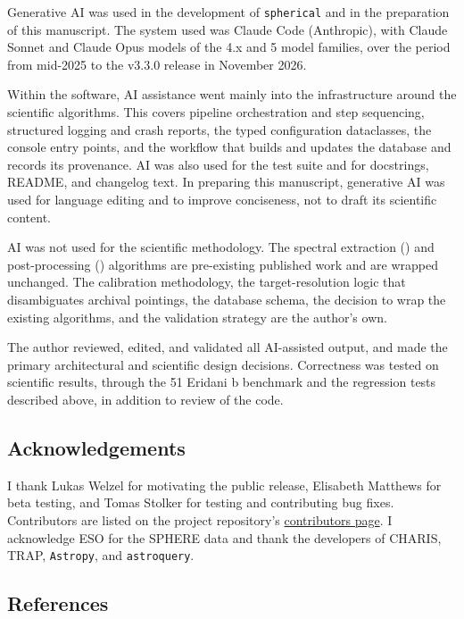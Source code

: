 \documentclass[
]{article}
\begin{document}
Generative AI was used in the development of \texttt{spherical} and in
the preparation of this manuscript. The system used was Claude Code
(Anthropic), with Claude Sonnet and Claude Opus models of the 4.x and 5
model families, over the period from mid-2025 to the v3.3.0 release in
November 2026.

Within the software, AI assistance went mainly into the infrastructure
around the scientific algorithms. This covers pipeline orchestration and
step sequencing, structured logging and crash reports, the typed
configuration dataclasses, the console entry points, and the workflow
that builds and updates the database and records its provenance. AI was
also used for the test suite and for docstrings, README, and changelog
text. In preparing this manuscript, generative AI was used for language
editing and to improve conciseness, not to draft its scientific content.

AI was not used for the scientific methodology. The spectral extraction
() and post-processing
() algorithms are
pre-existing published work and are wrapped unchanged. The calibration
methodology, the target-resolution logic that disambiguates archival
pointings, the database schema, the decision to wrap the existing
algorithms, and the validation strategy are the author's own.

The author reviewed, edited, and validated all AI-assisted output, and
made the primary architectural and scientific design decisions.
Correctness was tested on scientific results, through the 51 Eridani b
benchmark and the regression tests described above, in addition to
review of the code.

\subsection{Acknowledgements}\label{acknowledgements}

I thank Lukas Welzel for motivating the public release, Elisabeth
Matthews for beta testing, and Tomas Stolker for testing and
contributing bug fixes. Contributors are listed on the project
repository's
\href{https://github.com/m-samland/spherical/graphs/contributors}{contributors
page}. I acknowledge ESO for the SPHERE data and thank the developers of
CHARIS, TRAP, \texttt{Astropy}, and \texttt{astroquery}.

\subsection*{References}\label{references}
\end{document}
